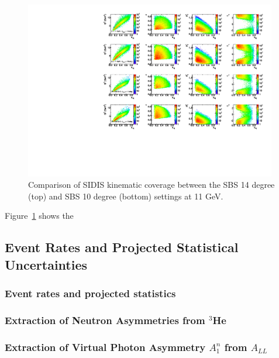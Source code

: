 \begin{figure}[h]
  \begin{center}
    \includegraphics[width=0.98\textwidth]{figures/kine14deg10deg_2Dcomparison.pdf}
  \end{center}
  \caption{\label{kine14_10_2D} Comparison of SIDIS kinematic coverage between the SBS 14 degree (top) and SBS 10 degree (bottom) settings at 11 GeV.}
\end{figure}
Figure~\ref{kine14_10_2D} shows the 

\subsection{Event Rates and Projected Statistical Uncertainties}
\subsubsection{Event rates and projected statistics}
\subsubsection{Extraction of Neutron Asymmetries from $^3$He}
\subsubsection{Extraction of Virtual Photon Asymmetry $A_1^n$ from $A_{LL}$}
